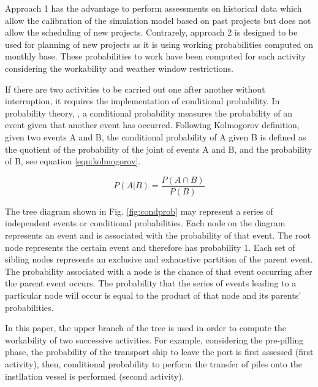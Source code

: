 


Approach 1 has the advantage to perform assessments on historical data which allow the calibration of the simulation model based on past projects but does not allow the scheduling of new projects. Contrarely, approach 2 is designed to be used for planning of new projects as it is using working probabilities computed on monthly base. These probabilities to work have been computed for each activity considering the workability and weather window restrictions.



If there are two activities to be carried out one after another without interruption, it requires the implementation of conditional probability.  
In probability theory, \cite{Thalemann2012}, a conditional probability measures the probability of an event given that another event has occurred. Following Kolmogorov definition, given two events A and B, the conditional probability of A given B is defined as the quotient of the probability of the joint of events A and B, and the probability of B, see equation \ref{eqn:kolmogorov}.

\begin{equation}
\label{eqn:kolmogorov}
P \left(A \vert B \right) = \frac{P \left(A \cap B \right)}{P \left( B \right)}
\end{equation}

The tree diagram shown in Fig. \ref{fig:condprob} may represent a series of independent events or conditional probabilities. Each node on the diagram represents an event and is associated with the probability of that event. The root node represents the certain event and therefore has probability 1. Each set of sibling nodes represents an exclusive and exhaustive partition of the parent event. The probability associated with a node is the chance of that event occurring after the parent event occurs. The probability that the series of events leading to a particular node will occur is equal to the product of that node and its parents' probabilities.

In this paper, the upper branch of the tree is used in order to compute the workability of two successive activities. For example, considering the pre-pilling phase, the probability of the transport ship to leave the port is first assessed (first activity), then, conditional probability to perform the transfer of piles onto the instllation vessel is performed (second activity).